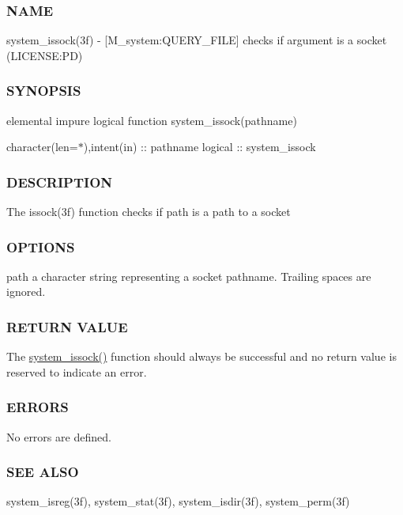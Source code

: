 \subsubsection*{N\+A\+ME}

system\+\_\+issock(3f) -\/ \mbox{[}M\+\_\+system\+:Q\+U\+E\+R\+Y\+\_\+\+F\+I\+LE\mbox{]} checks if argument is a socket (L\+I\+C\+E\+N\+SE\+:PD) 

\subsubsection*{S\+Y\+N\+O\+P\+S\+IS}

elemental impure logical function system\+\_\+issock(pathname)

character(len=$\ast$),intent(in) \+:\+: pathname logical \+:\+: system\+\_\+issock

\subsubsection*{D\+E\+S\+C\+R\+I\+P\+T\+I\+ON}

The issock(3f) function checks if path is a path to a socket

\subsubsection*{O\+P\+T\+I\+O\+NS}

path a character string representing a socket pathname. Trailing spaces are ignored.

\subsubsection*{R\+E\+T\+U\+RN V\+A\+L\+UE}

The \mbox{\hyperlink{namespacem__system_af6eb5074fe74552bc7a5e7d00f459087}{system\+\_\+issock()}} function should always be successful and no return value is reserved to indicate an error.

\subsubsection*{E\+R\+R\+O\+RS}

No errors are defined.

\subsubsection*{S\+EE A\+L\+SO}

system\+\_\+isreg(3f), system\+\_\+stat(3f), system\+\_\+isdir(3f), system\+\_\+perm(3f)

